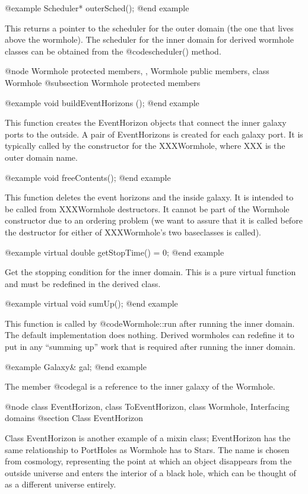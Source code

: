 @example
Scheduler* outerSched();
@end example

This returns a pointer to the scheduler for the outer domain (the one
that lives above the wormhole).  The scheduler for the inner domain
for derived wormhole classes can be obtained from the @code{scheduler()}
method.

@node Wormhole protected members,  , Wormhole public members, class Wormhole
@subsection Wormhole protected members

@example
void buildEventHorizons ();
@end example

This function creates the EventHorizon objects that connect the inner
galaxy ports to the outside.  A pair of EventHorizons is created for
each galaxy port.  It is typically called by the constructor for
the XXXWormhole, where XXX is the outer domain name.

@example
void freeContents();
@end example

This function deletes the event horizons and the inside galaxy.  It
is intended to be called from XXXWormhole destructors.  It cannot be
part of the Wormhole constructor due to an ordering problem (we want
to assure that it is called before the destructor for either of
XXXWormhole's two baseclasses is called).

@example
virtual double getStopTime() = 0;
@end example

Get the stopping condition for the inner domain.  This is a pure
virtual function and must be redefined in the derived class.

@example
virtual void sumUp();
@end example

This function is called by @code{Wormhole::run} after running the
inner domain.  The default implementation does nothing.  Derived
wormholes can redefine it to put in any ``summing up'' work that is
required after running the inner domain.

@example
Galaxy& gal;
@end example

The member @code{gal} is a reference to the inner galaxy of the Wormhole.

@node class EventHorizon, class ToEventHorizon, class Wormhole, Interfacing domains
@section Class EventHorizon

Class EventHorizon is another example of a mixin class; EventHorizon has
the same relationship to PortHoles as Wormhole has to Stars.  The name
is chosen from cosmology, representing the point at which an object
disappears from the outside universe and enters the interior of a black
hole, which can be thought of as a different universe entirely.

